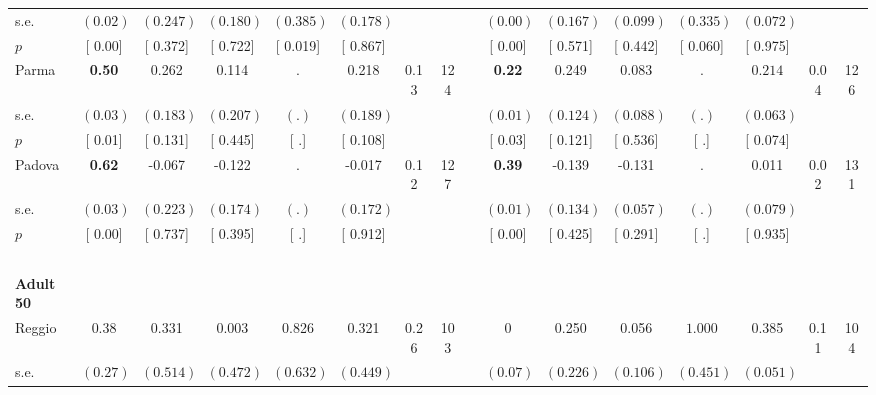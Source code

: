\begin{longtable}{L{8em} c c c c c c c p{1em} c c c c c c c}
\quad \quad \quad \quad s.e.& $ (     0.02)$ & $ (    0.247)$ & $ (    0.180)$ & $ (    0.385)$ & $ (    0.178)$ & & & & $ (     0.00)$ & $ (    0.167)$ & $ (    0.099)$ & $ (    0.335)$ & $ (    0.072)$ & &  \\*
\quad \quad \quad \quad $ p$ & [     0.00] & [    0.372] & [    0.722] & [    0.019] & [    0.867] & & & & [     0.00] & [    0.571] & [    0.442] & [    0.060] & [    0.975] & &  \\[1em]
\quad \quad \quad Parma& \textbf{     0.50} &     0.262 &     0.114 &         . &     0.218 &      0.13 &       124 & & \textbf{     0.22} &     0.249 &     0.083 &         . & $ \mathbf{    0.214}$ &      0.04 &       126  \\*
\quad \quad \quad \quad s.e.& $ (     0.03)$ & $ (    0.183)$ & $ (    0.207)$ & $ (        .)$ & $ (    0.189)$ & & & & $ (     0.01)$ & $ (    0.124)$ & $ (    0.088)$ & $ (        .)$ & $ (    0.063)$ & &  \\*
\quad \quad \quad \quad $ p$ & [     0.01] & [    0.131] & [    0.445] & [        .] & [    0.108] & & & & [     0.03] & [    0.121] & [    0.536] & [        .] & [    0.074] & &  \\[1em]
\quad \quad \quad Padova& \textbf{     0.62} &    -0.067 &    -0.122 &         . &    -0.017 &      0.12 &       127 & & \textbf{     0.39} &    -0.139 &    -0.131 &         . &     0.011 &      0.02 &       131  \\*
\quad \quad \quad \quad s.e.& $ (     0.03)$ & $ (    0.223)$ & $ (    0.174)$ & $ (        .)$ & $ (    0.172)$ & & & & $ (     0.01)$ & $ (    0.134)$ & $ (    0.057)$ & $ (        .)$ & $ (    0.079)$ & &  \\*
\quad \quad \quad \quad $ p$ & [     0.00] & [    0.737] & [    0.395] & [        .] & [    0.912] & & & & [     0.00] & [    0.425] & [    0.291] & [        .] & [    0.935] & &  \\[1em]
~\\[1em]
\quad \quad \textbf{Adult 50} & & & & & & & & & & & & & & & \\* 
\quad \quad \quad Reggio& 0.38 &     0.331 &     0.003 &     0.826 &     0.321 &      0.26 &       103 & & 0 &     0.250 &     0.056 & $ \mathbf{    1.000}$ &     0.385 &      0.11 &       104  \\*
\quad \quad \quad \quad s.e.& $ (     0.27)$ & $ (    0.514)$ & $ (    0.472)$ & $ (    0.632)$ & $ (    0.449)$ & & & & $ (     0.07)$ & $ (    0.226)$ & $ (    0.106)$ & $ (    0.451)$ & $ (    0.051)$ & &  \\*

\end{longtable}
